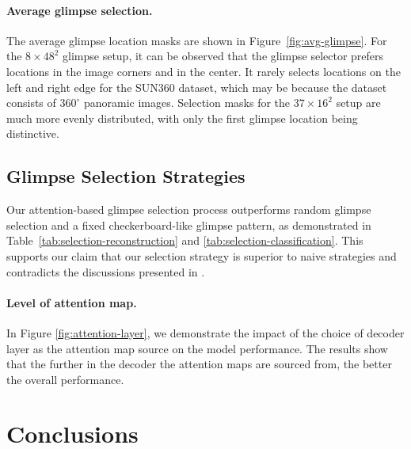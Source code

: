 \documentclass{article}
\begin{document}
\paragraph{Average glimpse selection.}



The average glimpse location masks are shown in Figure~\ref{fig:avg-glimpse}. For the $8\times48^2$ glimpse setup, it can be observed that the glimpse selector prefers locations in the image corners and in the center. It rarely selects locations on the left and right edge for the SUN360 dataset, which may be because the dataset consists of $360^{\circ}$ panoramic images. Selection masks for the $37\times16^2$ setup are much more evenly distributed, with only the first glimpse location being distinctive.

\subsection{Glimpse Selection Strategies}
\label{section:glimpse_selection_strategies}




Our attention-based glimpse selection process outperforms random glimpse selection and a fixed checkerboard-like glimpse pattern, as demonstrated in Table~\ref{tab:selection-reconstruction} and \ref{tab:selection-classification}. This supports our claim that our selection strategy is superior to naive strategies and contradicts the discussions presented in \cite{Jha2023WACV}.

\paragraph{Level of attention map.}



In Figure \ref{fig:attention-layer}, we demonstrate the impact of the choice of decoder layer as the attention map source on the model performance. The results show that the further in the decoder the attention maps are sourced from, the better the overall performance.

\section{Conclusions}
\end{document}
